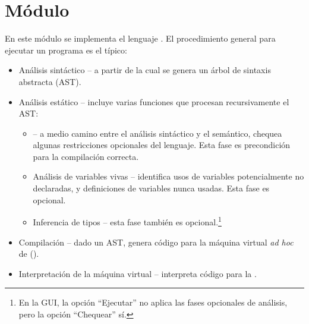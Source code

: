 \documentclass{article}
\begin{document}


\section{M\'odulo }

En este m\'odulo se implementa el lenguaje \Gbs.
El procedimiento general para ejecutar un programa \Gbs es
el t\'ipico:

\begin{itemize}
\item An\'alisis sint\'actico -- a partir de la
cual se genera un \'arbol de sintaxis abstracta (AST).
\item An\'alisis est\'atico -- incluye varias funciones
que procesan recursivamente el AST:
\begin{itemize}
\item {} -- a medio camino
entre el an\'alisis sint\'actico y el sem\'antico,
chequea algunas restricciones  opcionales
del lenguaje. Esta fase es precondici\'on para la compilaci\'on
correcta.
\item An\'alisis de variables vivas -- identifica usos
de variables potencialmente no declaradas, y definiciones
de variables nunca usadas. Esta fase es opcional.
\item Inferencia de tipos -- esta fase tambi\'en es
opcional.\footnote{En la GUI, la opci\'on ``Ejecutar'' no
aplica las fases opcionales de an\'alisis, pero la
opci\'on ``Chequear'' s\'i.}
\end{itemize}

\item Compilaci\'on -- dado un AST, genera c\'odigo para la
m\'aquina virtual {\em ad hoc} de \PGbs (\GVM).

\item Interpretaci\'on de la m\'aquina virtual -- interpreta
c\'odigo para la \GVM.
\end{itemize}
\end{document}

